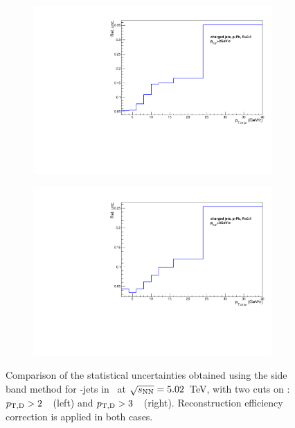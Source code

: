 \begin{figure}[bth]
\centering
\begin{subfigure}[b]{0.45\textwidth}
\includegraphics[width=\textwidth]{pPbplots/plotsSB_pt2_noDetails/jetPtSpectrumUnc_SB_Rebin_FASTwoSDD}

\end{subfigure}
\begin{subfigure}[b]{0.45\textwidth}
\includegraphics[width=\textwidth]{pPbplots/plotsSB_pt3_noDetails/jetPtSpectrumUnc_SB_Rebin_FASTwoSDD}

\end{subfigure}
\caption{Comparison of the statistical uncertainties obtained using the side band method for \Dstar-jets in \pPb\ at $\sqrt{s_{\rm NN}}=5.02$~TeV, with two cuts on \ptd: $p_{\mathrm{T,D}}>2$~\GeVc\ (left) and $p_{\mathrm{T,D}}>3$~\GeVc\ (right).
Reconstruction efficiency correction is applied in both cases.}
\label{fig:JetPt_pPb_SBUnc}
\end{figure}

